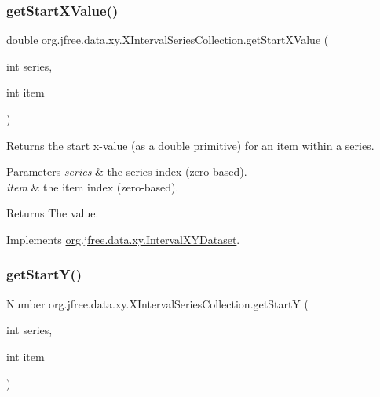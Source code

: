 \subsubsection{\texorpdfstring{get\+Start\+X\+Value()}{getStartXValue()}}
{\footnotesize\ttfamily double org.\+jfree.\+data.\+xy.\+X\+Interval\+Series\+Collection.\+get\+Start\+X\+Value (\begin{DoxyParamCaption}\item[{int}]{series,  }\item[{int}]{item }\end{DoxyParamCaption})}

Returns the start x-\/value (as a double primitive) for an item within a series.


\begin{DoxyParams}{Parameters}
{\em series} & the series index (zero-\/based). \\
\hline
{\em item} & the item index (zero-\/based).\\
\hline
\end{DoxyParams}
\begin{DoxyReturn}{Returns}
The value. 
\end{DoxyReturn}


Implements \mbox{\hyperlink{interfaceorg_1_1jfree_1_1data_1_1xy_1_1_interval_x_y_dataset_a437afe7f637a8d16ad305023a7819eef}{org.\+jfree.\+data.\+xy.\+Interval\+X\+Y\+Dataset}}.

\mbox{\label{classorg_1_1jfree_1_1data_1_1xy_1_1_x_interval_series_collection_a2856a59b5f688fcf7c824c1c0c1daa41}} 
\subsubsection{\texorpdfstring{get\+Start\+Y()}{getStartY()}}
{\footnotesize\ttfamily Number org.\+jfree.\+data.\+xy.\+X\+Interval\+Series\+Collection.\+get\+StartY (\begin{DoxyParamCaption}\item[{int}]{series,  }\item[{int}]{item }\end{DoxyParamCaption})}

